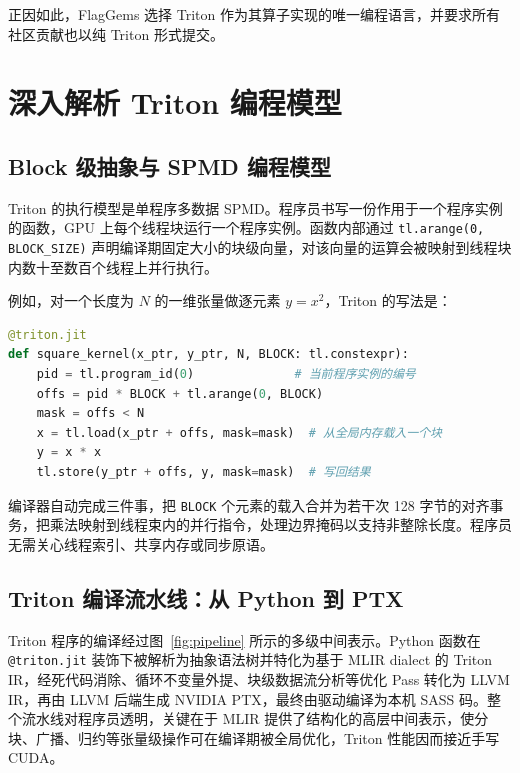 正因如此，FlagGems 选择 Triton 作为其算子实现的唯一编程语言，并要求所有社区贡献也以纯 Triton 形式提交。

\section{深入解析 Triton 编程模型}

\subsection{Block 级抽象与 SPMD 编程模型}
Triton 的执行模型是单程序多数据 SPMD。程序员书写一份作用于一个程序实例的函数，GPU 上每个线程块运行一个程序实例。函数内部通过 \texttt{tl.arange(0, BLOCK\_SIZE)} 声明编译期固定大小的块级向量，对该向量的运算会被映射到线程块内数十至数百个线程上并行执行。

例如，对一个长度为 $N$ 的一维张量做逐元素 $y=x^2$，Triton 的写法是：
\begin{lstlisting}[language=Python]
@triton.jit
def square_kernel(x_ptr, y_ptr, N, BLOCK: tl.constexpr):
    pid = tl.program_id(0)              # 当前程序实例的编号
    offs = pid * BLOCK + tl.arange(0, BLOCK)
    mask = offs < N
    x = tl.load(x_ptr + offs, mask=mask)  # 从全局内存载入一个块
    y = x * x
    tl.store(y_ptr + offs, y, mask=mask)  # 写回结果
\end{lstlisting}
编译器自动完成三件事，把 \texttt{BLOCK} 个元素的载入合并为若干次 128 字节的对齐事务，把乘法映射到线程束内的并行指令，处理边界掩码以支持非整除长度。程序员无需关心线程索引、共享内存或同步原语。

\subsection{Triton 编译流水线：从 Python 到 PTX}
Triton 程序的编译经过图~\ref{fig:pipeline} 所示的多级中间表示。Python 函数在 \texttt{@triton.jit} 装饰下被解析为抽象语法树并特化为基于 MLIR dialect 的 Triton IR，经死代码消除、循环不变量外提、块级数据流分析等优化 Pass 转化为 LLVM IR，再由 LLVM 后端生成 NVIDIA PTX，最终由驱动编译为本机 SASS 码。整个流水线对程序员透明，关键在于 MLIR 提供了结构化的高层中间表示，使分块、广播、归约等张量级操作可在编译期被全局优化，Triton 性能因而接近手写 CUDA。

